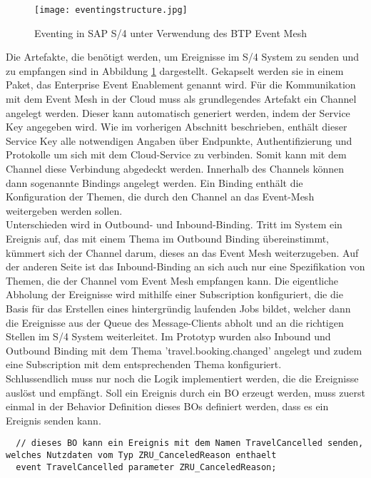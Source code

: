   \begin{figure}
    \centering
    \texttt{[image: eventingstructure.jpg]}
    \caption[Eventing in SAP S/4]{Eventing in SAP S/4 unter Verwendung des BTP Event Mesh \footnotemark}
    \label{BEstructure}
  \end{figure}
  Die Artefakte, die benötigt werden, um Ereignisse im S/4 System zu senden und zu empfangen sind in Abbildung \ref{BEstructure} dargestellt. Gekapselt werden sie in einem Paket, das Enterprise Event Enablement genannt wird. Für die Kommunikation mit dem Event Mesh in der Cloud muss als grundlegendes Artefakt ein Channel angelegt werden. Dieser kann automatisch generiert werden, indem der Service Key angegeben wird. Wie im vorherigen Abschnitt beschrieben, enthält dieser Service Key alle notwendigen Angaben über Endpunkte, Authentifizierung und Protokolle um sich mit dem Cloud-Service zu verbinden. Somit kann mit dem Channel diese Verbindung abgedeckt werden. Innerhalb des Channels können dann sogenannte Bindings angelegt werden. Ein Binding enthält die Konfiguration der Themen, die durch den Channel an das Event-Mesh weitergeben werden sollen.\\ Unterschieden wird in Outbound- und Inbound-Binding. Tritt im System ein Ereignis auf, das mit einem Thema im Outbound Binding übereinstimmt, kümmert sich der Channel darum, dieses an das Event Mesh weiterzugeben. Auf der anderen Seite ist das Inbound-Binding an sich auch nur eine Spezifikation von Themen, die der Channel vom Event Mesh empfangen kann. Die eigentliche Abholung der Ereignisse wird mithilfe einer Subscription konfiguriert, die die Basis für das Erstellen eines hintergründig laufenden Jobs bildet, welcher dann die Ereignisse aus der Queue des Message-Clients abholt und an die richtigen Stellen im S/4 System weiterleitet. Im Prototyp wurden also Inbound und Outbound Binding mit dem Thema 'travel.booking.changed' angelegt und zudem eine Subscription mit dem entsprechenden Thema konfiguriert.\\


Schlussendlich muss nur noch die Logik implementiert werden, die die Ereignisse auslöst und empfängt. Soll ein Ereignis durch ein \ac{BO} erzeugt werden, muss zuerst einmal in der Behavior Definition dieses \acp{BO} definiert werden, dass es ein Ereignis senden kann.

\begin{lstlisting}
  // dieses BO kann ein Ereignis mit dem Namen TravelCancelled senden, welches Nutzdaten vom Typ ZRU_CanceledReason enthaelt
  event TravelCancelled parameter ZRU_CanceledReason;
\end{lstlisting}

